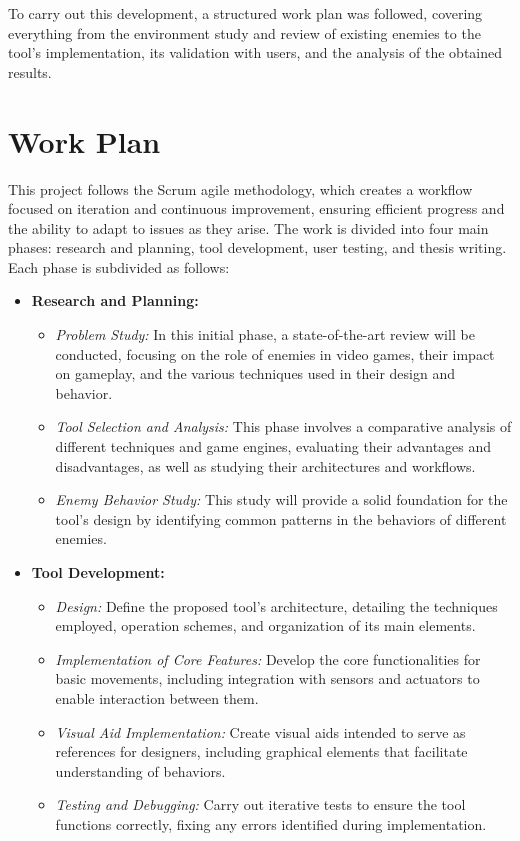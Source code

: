 To carry out this development, a structured work plan was followed, covering everything from the environment study and review of existing enemies to the tool’s implementation, its validation with users, and the analysis of the obtained results.

\section{Work Plan}
This project follows the Scrum agile methodology, which creates a workflow focused on iteration and continuous improvement, ensuring efficient progress and the ability to adapt to issues as they arise. The work is divided into four main phases: research and planning, tool development, user testing, and thesis writing. Each phase is subdivided as follows:

\begin{itemize}
  \item \textbf{Research and Planning:}
    \begin{itemize}
      \item \emph{Problem Study:} In this initial phase, a state-of-the-art review will be conducted, focusing on the role of enemies in video games, their impact on gameplay, and the various techniques used in their design and behavior.
      \item \emph{Tool Selection and Analysis:} This phase involves a comparative analysis of different techniques and game engines, evaluating their advantages and disadvantages, as well as studying their architectures and workflows.
      \item \emph{Enemy Behavior Study:} This study will provide a solid foundation for the tool’s design by identifying common patterns in the behaviors of different enemies.
    \end{itemize}

  \item \textbf{Tool Development:}
    \begin{itemize}
      \item \emph{Design:} Define the proposed tool’s architecture, detailing the techniques employed, operation schemes, and organization of its main elements.
      \item \emph{Implementation of Core Features:} Develop the core functionalities for basic movements, including integration with sensors and actuators to enable interaction between them.
      \item \emph{Visual Aid Implementation:} Create visual aids intended to serve as references for designers, including graphical elements that facilitate understanding of behaviors.
      \item \emph{Testing and Debugging:} Carry out iterative tests to ensure the tool functions correctly, fixing any errors identified during implementation.
    \end{itemize}


\end{itemize}
